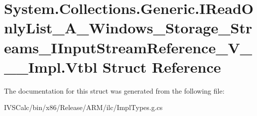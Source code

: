 \hypertarget{struct_system_1_1_collections_1_1_generic_1_1_i_read_only_list___a___windows___storage___streams7129a43613feddde3d591862ba155e73}{}\section{System.\+Collections.\+Generic.\+I\+Read\+Only\+List\+\_\+\+A\+\_\+\+Windows\+\_\+\+Storage\+\_\+\+Streams\+\_\+\+I\+Input\+Stream\+Reference\+\_\+\+V\+\_\+\+\_\+\+\_\+\+Impl.\+Vtbl Struct Reference}
\label{struct_system_1_1_collections_1_1_generic_1_1_i_read_only_list___a___windows___storage___streams7129a43613feddde3d591862ba155e73}


The documentation for this struct was generated from the following file\+:\begin{DoxyCompactItemize}
\item 
I\+V\+S\+Calc/bin/x86/\+Release/\+A\+R\+M/ilc/Impl\+Types.\+g.\+cs\end{DoxyCompactItemize}

